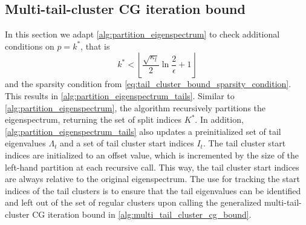 \subsection{Multi-tail-cluster CG iteration bound}\label{sec:partition_eigenspectrum_tail}
In this section we adapt \cref{alg:partition_eigenspectrum} to check additional conditions on $p=k^*$, that is
\[
    k^* < \left\lfloor\frac{\sqrt{\kappa_l}}{2}\ln{\frac{2}{\epsilon}} + 1 \right\rfloor
\] 
and the sparsity condition from \cref{eq:tail_cluster_bound_sparsity_condition}. This results in \cref{alg:partition_eigenspectrum_tails}. Similar to \cref{alg:partition_eigenspectrum}, the algorithm recursively partitions the eigenspectrum, returning the set of split indices $K^*$. In addition, \cref{alg:partition_eigenspectrum_tails} also updates a preinitialized set of tail eigenvalues $\Lambda_t$ and a set of tail cluster start indices $I_t$. The tail cluster start indices are initialized to an offset value, which is incremented by the size of the left-hand partition at each recursive call. This way, the tail cluster start indices are always relative to the original eigenspectrum. The use for tracking the start indices of the tail clusters is to ensure that the tail eigenvalues can be identified and left out of the set of regular clusters upon calling the generalized multi-tail-cluster CG iteration bound in \cref{alg:multi_tail_cluster_cg_bound}.

